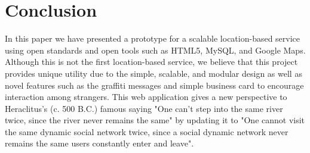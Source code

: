 \documentclass[11pt]{article}
\begin{document}
\section{Conclusion}

In this paper we have presented a prototype for a scalable location-based
service using open standards and open tools such as HTML5, MySQL, and
Google Maps.  Although this is not the first location-based service,
we believe that this project provides unique utility due to the simple,
scalable, and modular design as well as novel features such as the
graffiti messages and simple business card to encourage interaction among
strangers. This web application gives a new perspective to Heraclitus's
(c. 500 B.C.) famous saying "One can't step into the same river twice,
since the river never remains the same" by updating it to "One cannot
visit the same dynamic social network twice, since a social dynamic
network never remains the same users constantly enter and leave".




\end{document}
